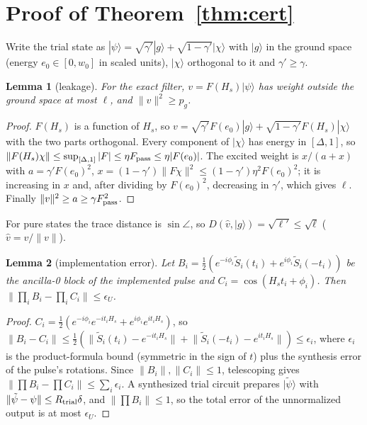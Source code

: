 \documentclass[aps,pra,twocolumn,superscriptaddress,nofootinbib]{revtex4-2}
\newtheorem{lemma}{Lemma}
\newcommand{\ket}[1]{|#1\rangle}
\newcommand{\norm}[1]{\lVert#1\rVert}
\begin{document}
\appendix

\section{Proof of Theorem~\ref{thm:cert}}
\label{app:proof}

Write the trial state as $\ket\psi=\sqrt{\gamma'}\ket g+\sqrt{1-\gamma'}\ket\chi$ with $\ket g$ in the
ground space (energy $e_0\in[0,w_0]$ in scaled units), $\ket\chi$ orthogonal to it and $\gamma'\ge\gamma$.

\begin{lemma}[leakage]\label{lem:leak}
For the exact filter, $v=F(H_s)\ket\psi$ has weight outside the ground space at most $\ell$, and
$\norm v^2\ge p_g$.
\end{lemma}
\begin{proof}
$F(H_s)$ is a function of $H_s$, so $v=\sqrt{\gamma'}F(e_0)\ket g+\sqrt{1-\gamma'}F(H_s)\ket\chi$ with
the two parts orthogonal. Every component of $\ket\chi$ has energy in $[\Delta,1]$, so
$\norm{F(H_s)\chi}\le\sup_{[\Delta,1]}|F|\le\eta F_{\rm pass}\le\eta|F(e_0)|$. The excited weight is
$x/(a+x)$ with $a=\gamma'F(e_0)^2$, $x=(1-\gamma')\norm{F\chi}^2\le(1-\gamma')\eta^2F(e_0)^2$; it is
increasing in $x$ and, after dividing by $F(e_0)^2$, decreasing in $\gamma'$, which gives $\ell$.
Finally $\norm v^2\ge a\ge\gamma F_{\rm pass}^2$.
\end{proof}

For pure states the trace distance is $\sin\angle$, so $D(\hat v,\ket g)=\sqrt{\ell'}\le\sqrt\ell$
($\hat v=v/\norm v$).

\begin{lemma}[implementation error]
Let $B_i=\frac12(e^{-i\phi_i}\tilde S_i(t_i)+e^{i\phi_i}\tilde S_i(-t_i))$ be the ancilla-0 block of the
implemented pulse and $C_i=\cos(H_st_i+\phi_i)$. Then
$\norm{\prod_iB_i-\prod_iC_i}\le\epsilon_U$.
\end{lemma}
\begin{proof}
$C_i=\frac12(e^{-i\phi_i}e^{-it_iH_s}+e^{i\phi_i}e^{it_iH_s})$, so
$\norm{B_i-C_i}\le\frac12(\norm{\tilde S_i(t_i)-e^{-it_iH_s}}+\norm{\tilde S_i(-t_i)-e^{it_iH_s}})\le\epsilon_i$,
where $\epsilon_i$ is the product-formula bound (symmetric in the sign of $t$) plus the synthesis error
of the pulse's rotations. Since $\norm{B_i},\norm{C_i}\le1$, telescoping gives
$\norm{\prod B_i-\prod C_i}\le\sum_i\epsilon_i$. A synthesized trial circuit prepares $\ket{\tilde\psi}$
with $\norm{\tilde\psi-\psi}\le R_{\rm trial}\delta$, and $\norm{\prod B_i}\le1$, so the total error of the
unnormalized output is at most $\epsilon_U$.
\end{proof}
\end{document}
